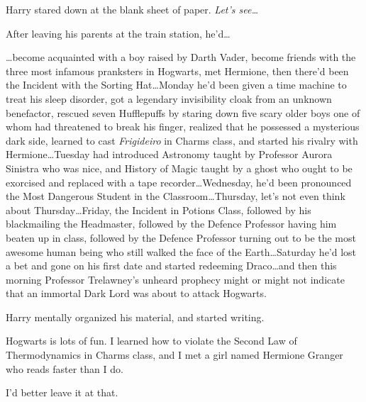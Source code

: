 Harry stared down at the blank sheet of paper. \emph{Let’s see…}

After leaving his parents at the train station, he’d…

…become acquainted with a boy raised by Darth Vader, become friends with
the three most infamous pranksters in Hogwarts, met Hermione, then there’d been
the Incident with the Sorting Hat…Monday he’d been given a time machine
to treat his sleep disorder, got a legendary invisibility cloak from an
unknown benefactor, rescued seven Hufflepuffs by staring down five scary older
boys one of whom had threatened to break his finger, realized that he possessed
a mysterious dark side, learned to cast \emph{Frigideiro} in Charms class, and
started his rivalry with Hermione…Tuesday had introduced
Astronomy taught by Professor Aurora Sinistra who was nice, and History of
Magic taught by a ghost who ought to be exorcised and replaced with a tape
recorder…Wednesday, he’d been pronounced the Most Dangerous Student in
the Classroom…Thursday, let’s not even think about Thursday…Friday,
the Incident in Potions Class, followed by his blackmailing the
Headmaster, followed by the Defence Professor having him beaten up in class,
followed by the Defence Professor turning out to be the most awesome human
being who still walked the face of the Earth…Saturday he’d lost a bet
and gone on his first date and started redeeming Draco…and then this
morning Professor Trelawney’s unheard prophecy might or might not indicate that
an immortal Dark Lord was about to attack Hogwarts.

Harry mentally organized his material, and started writing.

\begin{writtenNote}

Hogwarts is lots of fun. I learned how to violate the Second Law of
Thermodynamics in Charms class, and I met a girl named Hermione Granger who
reads faster than I do.

I’d better leave it at that.

\end{writtenNote}

